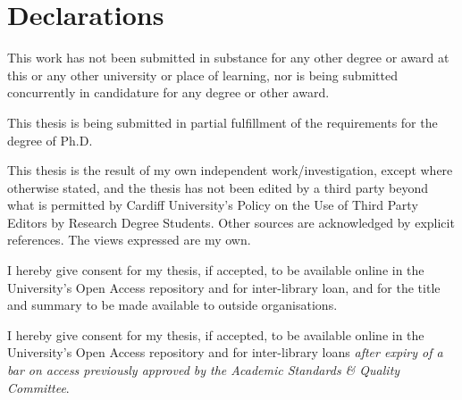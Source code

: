 \documentclass[../thesis.tex]{subfiles}
\begin{document}
\chapter*{Declarations}
\begin{SingleSpace}
This work has not been submitted in substance for any other degree or award at this or any other university or place of learning, nor is being submitted concurrently in candidature for any degree or other award.\\[\baselineskip]

\signatureblock

\noindent
This thesis is being submitted in partial fulfillment of the requirements for the degree of Ph.D.\\[\baselineskip]

\signatureblock

\noindent
This thesis is the result of my own independent work/investigation, except where otherwise stated, and the thesis has not been edited by a third party beyond what is permitted by Cardiff University’s Policy on the Use of Third Party Editors by Research Degree Students. Other sources are acknowledged by explicit references.  The views expressed are my own.\\[\baselineskip]

\signatureblock

\noindent
I hereby give consent for my thesis, if accepted, to be available online in the University’s Open Access repository and for inter-library loan, and for the title and summary to be made available to outside organisations.\\[\baselineskip]

\signatureblock

\noindent
I hereby give consent for my thesis, if accepted, to be available online in the University’s Open Access repository and for inter-library loans \textit{after expiry of a bar on access previously approved by the Academic Standards \& Quality Committee}. \\[\baselineskip]

\signatureblock
\end{SingleSpace}
\end{document}
